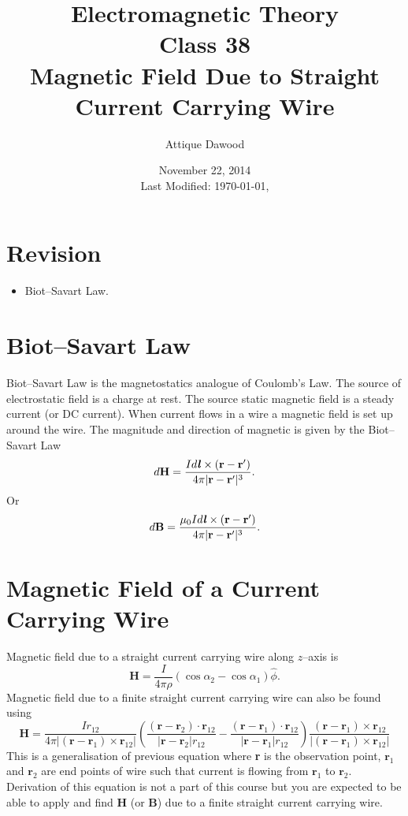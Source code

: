 \documentclass[12pt,a4paper]{article}
\title{Electromagnetic Theory\\Class 38\\Magnetic Field Due to Straight Current Carrying Wire}
\author{Attique Dawood}
\date{November 22, 2014\\[0.2cm] Last Modified: \today, \currenttime}
\begin{document}
\maketitle
\section{Revision}
\begin{itemize}
\item Biot--Savart Law.
\end{itemize}
\section{Biot--Savart Law}
Biot--Savart Law is the magnetostatics analogue of Coulomb's Law. The source of electrostatic field is a charge at rest. The source static magnetic field is a steady current (or DC current). When current flows in a wire a magnetic field is set up around the wire. The magnitude and direction of magnetic is given by the Biot--Savart Law
\begin{equation}
d\textbf{H}=\dfrac{Id\textbf{\textit{l}}\times(\textbf{r}-\textbf{r}')}{4\pi|\textbf{r}-\textbf{r}'|^{3}}.
\end{equation}
Or
\begin{equation}
d\textbf{B}=\dfrac{\mu_0Id\textbf{\textit{l}}\times(\textbf{r}-\textbf{r}')}{4\pi|\textbf{r}-\textbf{r}'|^{3}}.
\end{equation}
\section{Magnetic Field of a Current Carrying Wire}
Magnetic field due to a straight current carrying wire along $z$--axis is
\begin{equation}
\textbf{H}=\dfrac{I}{4\pi\rho}(\cos\alpha_2-\cos\alpha_1)\hat\phi.
\end{equation}
Magnetic field due to a finite straight current carrying wire can also be found using
\begin{equation}
\textbf{H}=\dfrac{Ir_{12}}{4\pi|(\textbf{r}-\textbf{r}_1)\times\textbf{r}_{12}|}\left(\dfrac{(\textbf{r}-\textbf{r}_2)\cdot\textbf{r}_{12}}{|\textbf{r}-\textbf{r}_2|r_{12}}-\dfrac{(\textbf{r}-\textbf{r}_1)\cdot\textbf{r}_{12}}{|\textbf{r}-\textbf{r}_1|r_{12}}\right)\dfrac{(\textbf{r}-\textbf{r}_1)\times\textbf{r}_{12}}{|(\textbf{r}-\textbf{r}_1)\times \textbf{r}_{12}|}
\end{equation}
This is a generalisation of previous equation where \textbf{r} is the observation point, $\textbf{r}_1$ and $\textbf{r}_2$ are end points of wire such that current is flowing from $\textbf{r}_1$ to $\textbf{r}_2$. Derivation of this equation is not a part of this course but you are expected to be able to apply and find \textbf{H} (or \textbf{B}) due to a finite straight current carrying wire.
\newpage
\end{document}
